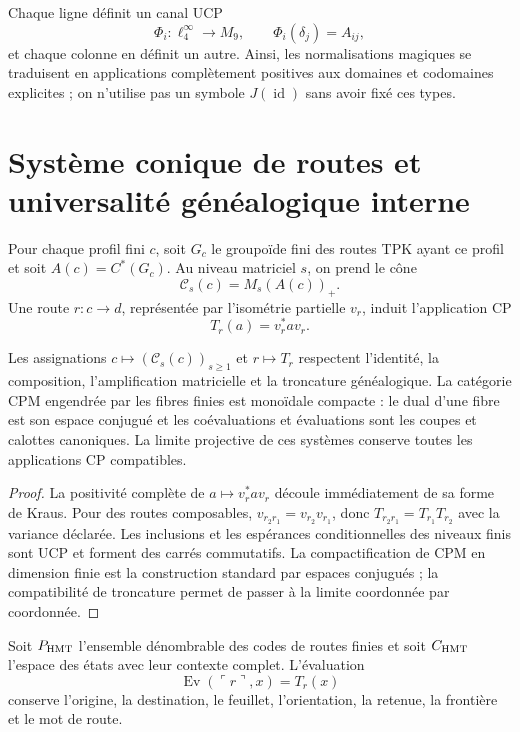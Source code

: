 Chaque ligne définit un canal UCP
\[
 \Phi_i:\ell^\infty_4\to M_9,
 \qquad \Phi_i(\delta_j)=A_{ij},
\]
et chaque colonne en définit un autre. Ainsi, les normalisations magiques se traduisent en
applications complètement positives aux domaines et codomaines explicites ; on n'utilise pas
un symbole \(J(\operatorname{id})\) sans avoir fixé ces types.

\section{Système conique de routes et universalité généalogique interne}
\label{sec:cpe-s-system-universalidad}

Pour chaque profil fini \(c\), soit \(G_c\) le groupoïde fini des routes TPK
ayant ce profil et soit \(A(c)=C^*(G_c)\). Au niveau matriciel \(s\), on prend le
cône
\[
 \mathcal C_s(c)=M_s(A(c))_+.
\]
Une route \(r:c\to d\), représentée par l'isométrie partielle \(v_r\),
induit l'application CP
\[
 T_r(a)=v_r^*av_r.
\]

\begin{theorem}
\label{thm:cpe-s-system-tpk}
Les assignations \(c\mapsto(\mathcal C_s(c))_{s\ge1}\) et
\(r\mapsto T_r\) respectent l'identité, la composition, l'amplification matricielle et la
troncature généalogique. La catégorie CPM engendrée par les fibres finies
est monoïdale compacte : le dual d'une fibre est son espace conjugué et les
coévaluations et évaluations sont les coupes et calottes canoniques. La limite
projective de ces systèmes conserve toutes les applications CP compatibles.
\end{theorem}

\begin{proof}
La positivité complète de \(a\mapsto v_r^*av_r\) découle immédiatement de sa forme
de Kraus. Pour des routes composables,
\(v_{r_2r_1}=v_{r_2}v_{r_1}\), donc
\(T_{r_2r_1}=T_{r_1}T_{r_2}\) avec la variance déclarée. Les inclusions et les
espérances conditionnelles des niveaux finis sont UCP et forment des carrés
commutatifs. La compactification de CPM en dimension finie est la construction
standard par espaces conjugués ; la compatibilité de troncature permet de
passer à la limite coordonnée par coordonnée.
\end{proof}

Soit \(\mathsf P_{\rm HMT}\) l'ensemble dénombrable des codes de routes
finies et soit \(\mathsf C_{\rm HMT}\) l'espace des états avec leur contexte
complet. L'évaluation
\[
 \operatorname{Ev}(\ulcorner r\urcorner,x)=T_r(x)
\]
conserve l'origine, la destination, le feuillet, l'orientation, la retenue, la frontière et le mot de
route.


